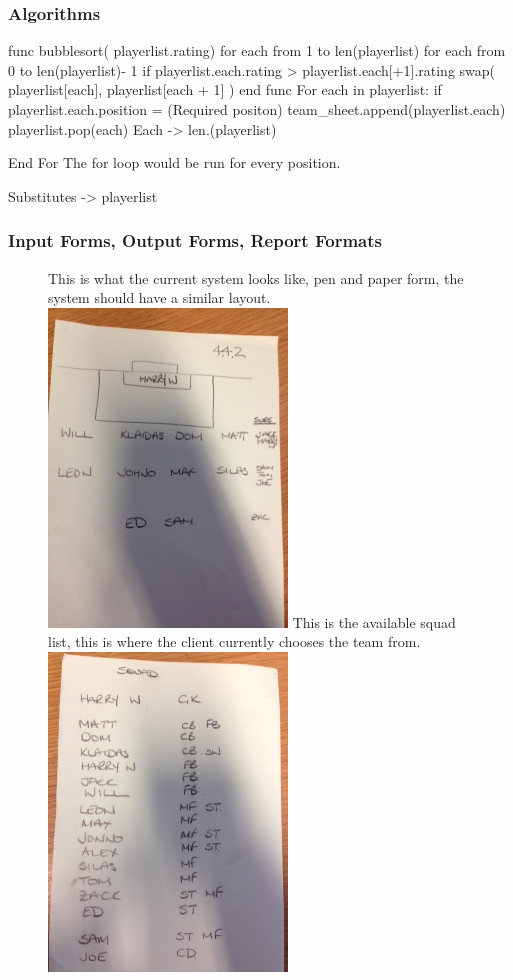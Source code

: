 \subsubsection{Algorithms}

func bubblesort( playerlist.rating)
    for each from 1 to len(playerlist)
        for each from 0 to  len(playerlist)- 1
           if playerlist.each.rating > playerlist.each[+1].rating
              swap( playerlist[each], playerlist[each + 1] )
end func
For each in playerlist:
	if playerlist.each.position = (Required positon)\:
		team\_sheet.append(playerlist.each)
		playerlist.pop(each)
		Each -> len.(playerlist)
		
	
End For
The for loop would be run for every position.

Substitutes ->  playerlist 

\subsubsection{Input Forms, Output Forms, Report Formats}
\begin{figure}[H]
	This is what the current system looks like, pen and paper form, the system should have a similar layout.
	\includegraphics{formation}
	This is the available squad list, this is where the client currently chooses the team from. 
	\includegraphics{squad}
\end{figure}


